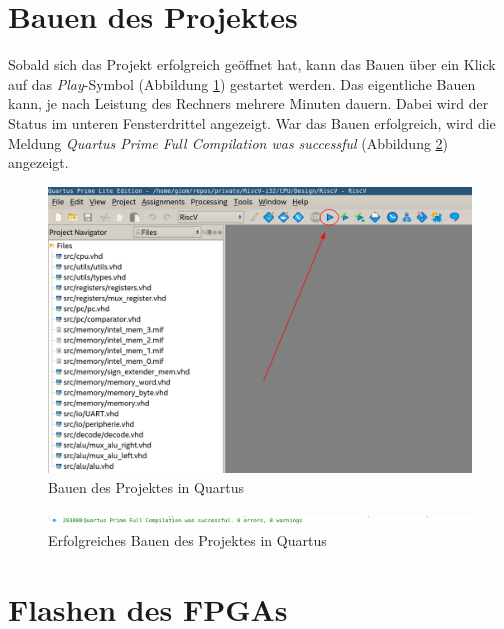     \section{Bauen des Projektes}
        Sobald sich das Projekt erfolgreich geöffnet hat, kann das Bauen über ein Klick
        auf das \textit{Play}-Symbol (Abbildung \ref{fig:quartus_play}) gestartet werden. Das eigentliche Bauen kann, je nach
        Leistung des Rechners mehrere Minuten dauern. Dabei wird der Status im unteren
        Fensterdrittel angezeigt. War das Bauen erfolgreich, wird die Meldung
        \textit{Quartus Prime Full Compilation was successful} (Abbildung \ref{fig:quartus_build_sucessful})
        angezeigt.

        \begin{figure}[H]
            \centering
            \includegraphics[scale=0.6]{img/quartus_build.png}
            \caption{Bauen des Projektes in Quartus}
            \label{fig:quartus_play}
        \end{figure}

        \begin{figure}[H]
            \centering
            \includegraphics[scale=0.6]{img/quartus_build_sucessfull.png}
            \caption{Erfolgreiches Bauen des Projektes in Quartus}
            \label{fig:quartus_build_sucessful}
        \end{figure}


    \section{Flashen des FPGAs}\label{lab:flash-fpga}

